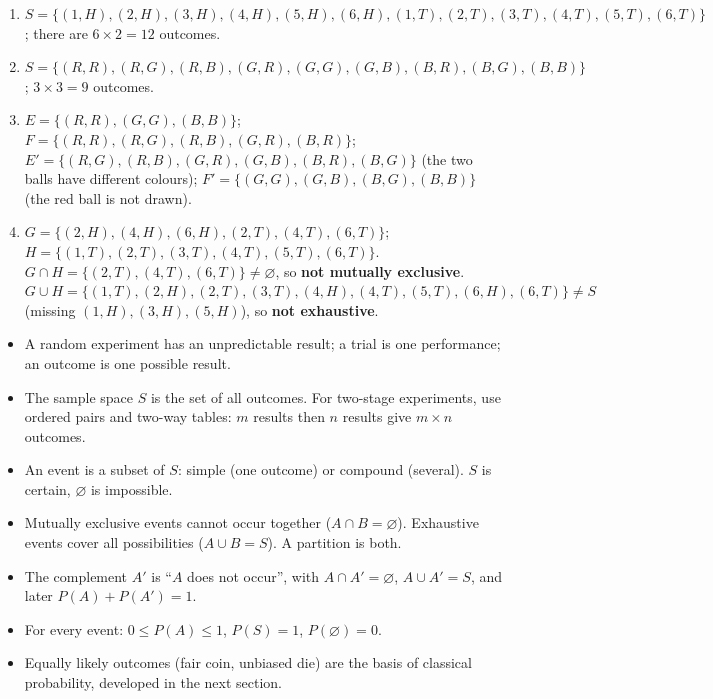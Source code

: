 \documentclass[11pt]{article}
\newcommand{\cle}[1]{{\popxbold\color{popdark}#1}}
\begin{document}
\begin{corrige}[Exercise 1]
\begin{enumerate}
\item $S = \{(1,H),(2,H),(3,H),(4,H),(5,H),(6,H),(1,T),(2,T),(3,T),(4,T),(5,T),(6,T)\}$; there are $6 \times 2 = 12$ outcomes.
\item $S = \{(R,R),(R,G),(R,B),(G,R),(G,G),(G,B),(B,R),(B,G),(B,B)\}$; $3 \times 3 = 9$ outcomes.
\item $E = \{(R,R),(G,G),(B,B)\}$; $F = \{(R,R),(R,G),(R,B),(G,R),(B,R)\}$; $E' = \{(R,G),(R,B),(G,R),(G,B),(B,R),(B,G)\}$ (the two balls have different colours); $F' = \{(G,G),(G,B),(B,G),(B,B)\}$ (the red ball is not drawn).
\item $G = \{(2,H),(4,H),(6,H),(2,T),(4,T),(6,T)\}$; $H = \{(1,T),(2,T),(3,T),(4,T),(5,T),(6,T)\}$. $G \cap H = \{(2,T),(4,T),(6,T)\} \ne \varnothing$, so \textbf{not mutually exclusive}. $G \cup H = \{(1,T),(2,H),(2,T),(3,T),(4,H),(4,T),(5,T),(6,H),(6,T)\} \ne S$ (missing $(1,H),(3,H),(5,H)$), so \textbf{not exhaustive}.
\end{enumerate}
\end{corrige}

\begin{aretenir}
\begin{itemize}
\item A \cle{random experiment} has an unpredictable result; a \cle{trial} is one performance; an \cle{outcome} is one possible result.
\item The \cle{sample space} $S$ is the set of all outcomes. For two-stage experiments, use ordered pairs and two-way tables: $m$ results then $n$ results give $m \times n$ outcomes.
\item An \cle{event} is a subset of $S$: simple (one outcome) or compound (several). $S$ is certain, $\varnothing$ is impossible.
\item \cle{Mutually exclusive} events cannot occur together ($A \cap B = \varnothing$). \cle{Exhaustive} events cover all possibilities ($A \cup B = S$). A partition is both.
\item The \cle{complement} $A'$ is ``$A$ does not occur'', with $A \cap A' = \varnothing$, $A \cup A' = S$, and later $P(A) + P(A') = 1$.
\item For every event: $0 \le P(A) \le 1$, $P(S) = 1$, $P(\varnothing) = 0$.
\item \cle{Equally likely} outcomes (fair coin, unbiased die) are the basis of classical probability, developed in the next section.
\end{itemize}
\end{aretenir}
\end{document}

